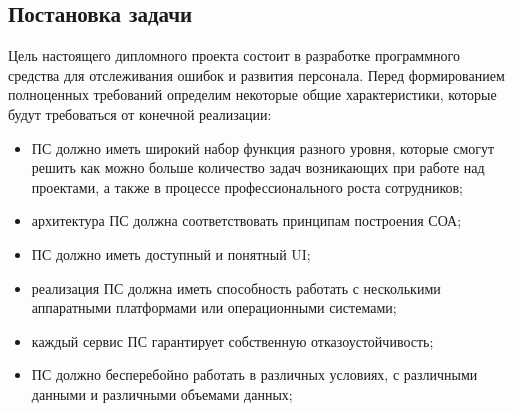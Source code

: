 \subsection{Постановка задачи}\label{sec:analysis:task}

Цель настоящего дипломного проекта состоит в разработке программного средства для отслеживания ошибок и развития персонала. Перед формированием полноценных требований определим некоторые общие характеристики, которые будут требоваться от конечной реализации:
\begin{itemize}
    \item ПС должно иметь широкий набор функция разного уровня, которые смогут решить как можно больше количество задач возникающих при работе над проектами, а также в процессе профессионального роста сотрудников;
    \item архитектура ПС должна соответствовать принципам построения СОА;
    \item ПС должно иметь доступный и понятный UI;
    \item реализация ПС должна иметь способность работать с несколькими аппаратными платформами или операционными системами;
    \item каждый сервис ПС гарантирует собственную отказоустойчивость;
    \item ПС должно бесперебойно работать в различных условиях, с различными данными и различными объемами данных;
\end{itemize}
